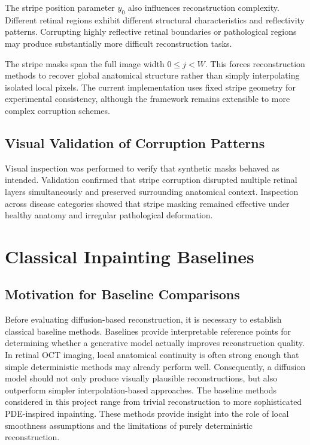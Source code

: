 \documentclass[12pt,oneside]{article}
\begin{document}
The stripe position parameter $y_0$ also influences reconstruction complexity. Different retinal regions exhibit different structural characteristics and reflectivity patterns. Corrupting highly reflective retinal boundaries or pathological regions may produce substantially more difficult reconstruction tasks.

The stripe masks span the full image width $0 \le j < W.$
This forces reconstruction methods to recover global anatomical structure rather than simply interpolating isolated local pixels.
The current implementation uses fixed stripe geometry for experimental consistency, although the framework remains extensible to more complex corruption schemes.

\subsection{Visual Validation of Corruption Patterns}

Visual inspection was performed to verify that synthetic masks behaved as intended. Validation confirmed that stripe corruption disrupted multiple retinal layers simultaneously and preserved surrounding anatomical context.
Inspection across disease categories showed that stripe masking remained effective under healthy anatomy and irregular pathological deformation.

\section{Classical Inpainting Baselines}

\subsection*{Motivation for Baseline Comparisons}

Before evaluating diffusion-based reconstruction, it is necessary to establish classical baseline methods. Baselines provide interpretable reference points for determining whether a generative model actually improves reconstruction quality.
In retinal OCT imaging, local anatomical continuity is often strong enough that simple deterministic methods may already perform well. Consequently, a diffusion model should not only produce visually plausible reconstructions, but also outperform simpler interpolation-based approaches.
The baseline methods considered in this project range from trivial reconstruction to more sophisticated PDE-inspired inpainting. These methods provide insight into the role of local smoothness assumptions and the limitations of purely deterministic reconstruction.
\end{document}
